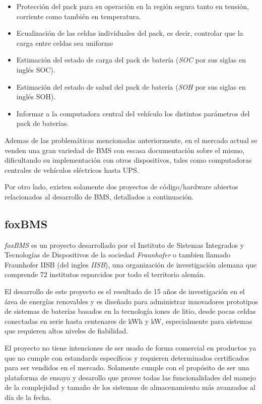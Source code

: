 \documentclass[10pt, a4paper]{report}
\begin{document}
\begin{itemize}
    \item Protección del pack para su operación en la región segura tanto 
        en tensión, corriente como también en temperatura.
    \item Ecualización de las celdas individuales del pack, es decir,
        controlar que la carga entre celdas sea uniforme
    \item Estimación del estado de carga del pack de batería 
        (\emph{\acrshort{SOC}} por sus siglas en ingl\'es \acrlong{SOC}).
    \item Estimación del estado de salud del pack de batería 
        (\emph{\acrshort{SOH}} por sus siglas en ingl\'es \acrlong{SOH}).
    \item Informar a la computadora central del vehículo los distintos 
        parámetros del pack de baterías.
\end{itemize}

\noindent Ademas de las problem\'aticas mencionadas anteriormente, en el mercado
actual se venden una gran variedad de \acrshort{BMS} con escasa documentaci\'on
sobre el mismo, dificultando su implementaci\'on con otros dispositivos, tales 
como computadoras centrales de veh\'iculos el\'ectricos hasta \acrshort{UPS}.

Por otro lado, existen solamente dos proyectos de c\'odigo/hardware abiertos
relacionados al desarrollo de \acrshort{BMS}, detallados a continuaci\'on.

\subsection{foxBMS}

\emph{foxBMS} \cite{foxbms} es un proyecto desarrollado por el Instituto de Sistemas
Integrados y Tecnolog\'ias de Dispositivos de la sociedad \emph{Fraunhofer} o
tambien llamado Fraunhofer IISB (del ingles \emph{\acrlong{IISB}}), una
organización de investigación alemana que comprende 72 institutos esparcidos por
todo el territorio alem\'an.

\noindent El desarrollo de este proyecto es el resultado de 15 años de
investigaci\'on en el \'area de energ\'ias renovables y es diseñado para 
administrar innovadores prototipos de sistemas de bater\'ias basados en la 
tecnolog\'ia iones de litio, desde pocas celdas conectadas en serie hasta 
centenares de kWh y kW, especialmente para sistemas que requieren altos niveles 
de fiabilidad.

\noindent El proyecto no tiene intenciones de ser usado de forma comercial en
productos ya que no cumple con estandards espec\'ificos y requieren determinados
certificados para ser vendidos en el mercado. Solamente cumple con el 
prop\'osito de ser una plataforma de ensayo y desarollo que provee todas las 
funcionalidades del manejo de la complejidad y tamaño de los sistemas de 
almacenamiento más avanzados al d\'ia de la fecha.
\end{document}
